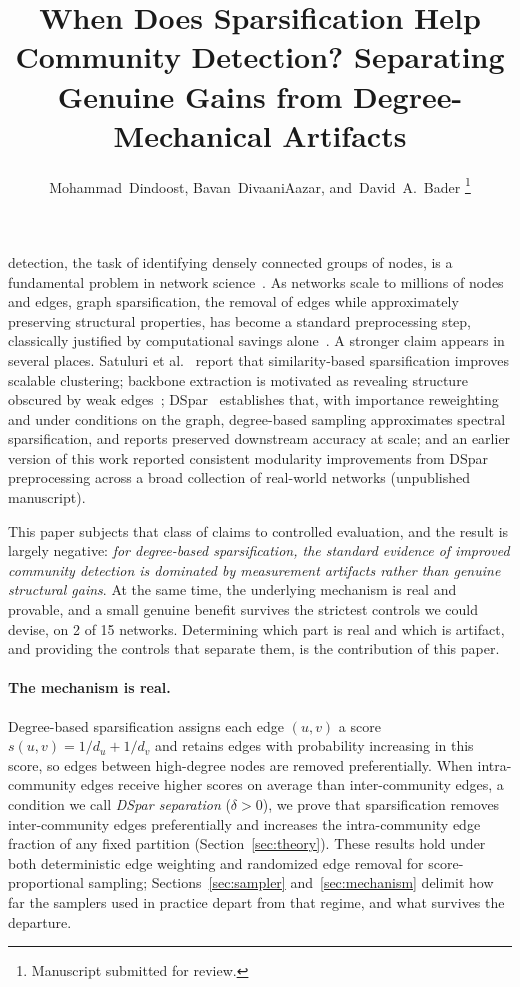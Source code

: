 \documentclass[10pt,journal,compsoc]{IEEEtran}
\title{When Does Sparsification Help Community Detection? Separating Genuine Gains from Degree-Mechanical Artifacts}
\author{Mohammad~Dindoost, Bavan~DivaaniAazar, and~David~A.~Bader%
\IEEEcompsocitemizethanks{\IEEEcompsocthanksitem M. Dindoost, B. DivaaniAazar, and D.~A.~Bader are with the Department of Computer Science, New Jersey Institute of Technology, Newark, NJ 07102 USA.\protect\\
E-mail: md724@njit.edu, bd344@njit.edu, bader@njit.edu}%
\thanks{Manuscript submitted for review.}}
\begin{document}
\maketitle
\IEEEdisplaynontitleabstractindextext
\IEEEpeerreviewmaketitle

 detection, the task of identifying densely connected groups of nodes, is a fundamental problem in network science~\cite{fortunato202220, karatacs2018application}.
As networks scale to millions of nodes and edges, graph sparsification, the removal of edges while approximately preserving structural properties, has become a standard preprocessing step, classically justified by computational savings alone~\cite{spielman2008graph, benczur2015randomized}.
A stronger claim appears in several places.
Satuluri et al.~\cite{satuluri2011local} report that similarity-based sparsification improves scalable clustering; backbone extraction is motivated as revealing structure obscured by weak edges~\cite{serrano2009extracting, coscia2017backboning}; DSpar~\cite{liu2023dspar} establishes that, with importance reweighting and under conditions on the graph, degree-based sampling approximates spectral sparsification, and reports preserved downstream accuracy at scale; and an earlier version of this work reported consistent modularity improvements from DSpar preprocessing across a broad collection of real-world networks (unpublished manuscript).

This paper subjects that class of claims to controlled evaluation, and the result is largely negative: \emph{for degree-based sparsification, the standard evidence of improved community detection is dominated by measurement artifacts rather than genuine structural gains}.
At the same time, the underlying mechanism is real and provable, and a small genuine benefit survives the strictest controls we could devise, on 2 of 15 networks.
Determining which part is real and which is artifact, and providing the controls that separate them, is the contribution of this paper.

\paragraph{The mechanism is real.}
Degree-based sparsification assigns each edge $(u,v)$ a score $s(u,v) = 1/d_u + 1/d_v$ and retains edges with probability increasing in this score, so edges between high-degree nodes are removed preferentially.
When intra-community edges receive higher scores on average than inter-community edges, a condition we call \emph{DSpar separation} ($\delta > 0$), we prove that sparsification removes inter-community edges preferentially and increases the intra-community edge fraction of any fixed partition (Section~\ref{sec:theory}).
These results hold under both deterministic edge weighting and randomized edge removal for score-proportional sampling; Sections~\ref{sec:sampler} and~\ref{sec:mechanism} delimit how far the samplers used in practice depart from that regime, and what survives the departure.
\end{document}
